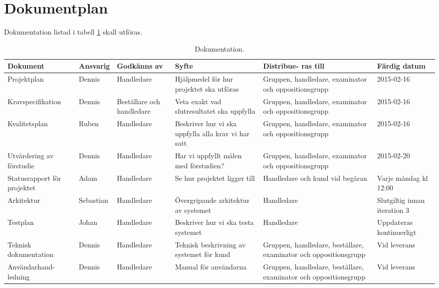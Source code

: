 \section{Dokumentplan}
Dokumentation listad i tabell \ref{dokumentation:tabell} skall utföras.

\begin{table}[H]
	\centering
		\begin{tabularx}{\textwidth}{| p{25mm} | l | X | p{25mm} | X | X |}
			\hline
			\textbf{Dokument} & \textbf{Ansvarig} & \textbf{Godkänns av} & \textbf{Syfte} & \textbf{Distribue-
  ras till} & \textbf{Färdig datum} \\\hline

    		
			{Projektplan} & {Dennis} & {Handledare} & {Hjälpmedel för hur projektet ska utföras} & {Gruppen, handledare, examinator och oppositionsgrupp} & {2015-02-16} \\\hline
			
			{Kravspecifikation} & {Dennis} & {Beställare och handledare} & {Veta exakt vad slutresultatet ska uppfylla} & {Gruppen, handledare, examinator och oppositionsgrupp} & {2015-02-16} \\\hline
			
			{Kvalitetsplan} & {Ruben} & {Handledare} & {Beskriver hur vi ska uppfylla alla krav vi har satt} & {Gruppen, handledare, examinator och oppositionsgrupp} & {2015-02-16} \\\hline
			
						{Utvärdering av förstudie} & {Dennis} & {Handledare} & {Har vi uppfyllt målen med förstudien?} & {Gruppen, handledare, examinator och oppositionsgrupp} & {2015-02-20} \\\hline
			
			{Statusrapport för projektet} & {Adam} & {Handledare} & {Se hur projektet ligger till} & {Handledare och kund vid begäran} & {Varje måndag kl 12:00} \\\hline
			
            {Arkitektur} & {Sebastian} & {Handledare} & {Övergripande arkitektur av systemet} & {Handledare} & {Slutgiltig innan iteration 3} \\\hline
               {Testplan} & {Johan} & {Handledare} & {Beskriver hur vi ska testa systemet} & {Handledare} & {Uppdateras kontinuerligt} \\\hline

          {Teknisk dokumentation} & {Dennis} & {Handledare} & {Teknisk beskrivning av systemet för kund} & {Gruppen, handledare, beställare, examinator och oppositionsgrupp} & {Vid leverans} \\\hline			
			
            {Användarhand-ledning} & {Dennis} & {Handledare} & {Manual för användarna} & {Gruppen, handledare, beställare, examinator och oppositionsgrupp} & {Vid leverans} \\\hline
            
			
			
		\end{tabularx}
	\caption{Dokumentation.} \label{dokumentation:tabell}
\end{table}
